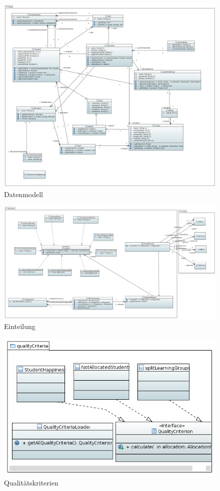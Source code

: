 \documentclass[parskip=full]{scrartcl}
\begin{document}
\begin{figure}[!htb]
\centering
\includegraphics[width=\linewidth]{bilder/daten.png}
\caption{Datenmodell}
\label{uml:data}
\end{figure}

\begin{figure}
\centering
\includegraphics[width=\linewidth]{bilder/einteilung.png}
\caption{Einteilung}
\label{uml:allocation}
\end{figure}

\begin{figure}[!htb]
\centering
\includegraphics[width=\linewidth]{bilder/qualityCriteria.png}
\caption{Qualitätskriterien}
\label{uml:qualityCriteria}
\end{figure}
\end{document}
